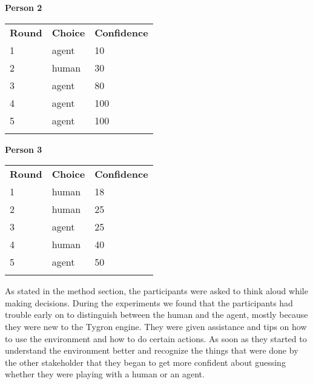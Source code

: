 \documentclass[11pt,a4paper]{article}
\begin{document}
\textbf{Person 2}
\begin{tabular}{lll}
\textbf{Round} & \textbf{Choice}  & \textbf{Confidence}\\ 
1 & agent  & 10        \\
2 & human  & 30         \\
3 & agent  & 80         \\
4 & agent  & 100         \\
5 & agent  & 100       \\\\
\end{tabular}

\textbf{Person 3}
\begin{tabular}{lll}
\textbf{Round} & \textbf{Choice}  & \textbf{Confidence}\\ 
1 & human  & 18         \\
2 & human  & 25         \\
3 & agent  & 25         \\
4 & human  & 40         \\
5 & agent  & 50        \\\\
\end{tabular}

As stated in the method section, the participants were asked to think aloud while making decisions. During the experiments we found that the participants had trouble early on to distinguish between the human and the agent, mostly because they were new to the Tygron engine. They were given assistance and tips on how to use the environment and how to do certain actions. As soon as they started to understand the environment better and recognize the things that were done by the other stakeholder that they began to get more confident about guessing whether they were playing with a human or an agent.
\end{document}
